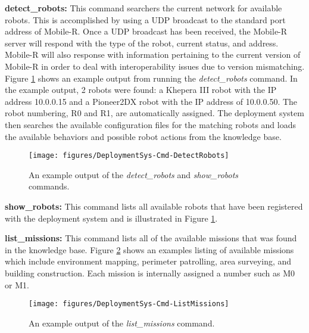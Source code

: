     \textbf{detect\_robots:} 
      This command searchers the current network for available robots. 
      This is accomplished by using a UDP broadcast to the standard port address 
        of Mobile-R.
      Once a UDP broadcast has been received, the Mobile-R server will
        respond with the type of the robot, current status, and address.
      Mobile-R will also response with information pertaining to the
        current version of Mobile-R in order to deal with 
        interoperability issues due to version mismatching.
      Figure \ref{fig:dep_detectrobots} shows an example output from running the
        \textit{detect\_robots} command.
      In the example output, 2 robots were found: a Khepera III robot with the IP
        address 10.0.0.15 and a Pioneer2DX robot with the IP address of 
        10.0.0.50.
      The robot numbering, R0 and R1, are automatically assigned.
      The deployment system then searches the available configuration files for
        the matching robots and loads the available behaviors and possible
        robot actions from the knowledge base.
      \begin{figure}%
      \centerline{
          \texttt{[image: figures/DeploymentSys-Cmd-DetectRobots]}}
      \caption{An example output of the \textit{detect\_robots} and 
               \textit{show\_robots} commands.}
      \label{fig:dep_detectrobots}
      \end{figure}

    \textbf{show\_robots:} 
      This command lists all available robots that have been registered with the
        deployment system and is illustrated in Figure \ref{fig:dep_detectrobots}.

    \textbf{list\_missions:}
      This command lists all of the available missions that was found in the 
        knowledge base.
      Figure \ref{fig:dep_listmissions} shows an examples listing of available
         missions which include environment mapping, perimeter patrolling, 
         area surveying, and building construction.
      Each mission is internally assigned a number such as M0 or M1.
      \begin{figure}%
      \centerline{
          \texttt{[image: figures/DeploymentSys-Cmd-ListMissions]}}
      \caption{An example output of the \textit{list\_missions} command.}
      \label{fig:dep_listmissions}
      \end{figure}

